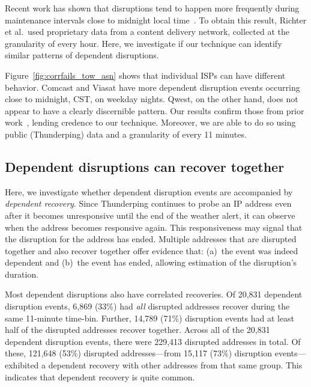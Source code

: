 Recent work has shown that disruptions tend to happen more frequently
during maintenance intervals close to midnight local
time~\cite{advancing-outage-art}. To obtain this result, Richter et
al.~used proprietary data from a content delivery network, collected at
the granularity of every hour.  Here, we investigate if our technique
can identify similar patterns of dependent disruptions.

Figure~\ref{fig:corrfails_tow_asn} shows that individual ISPs can have
different behavior. Comcast and Viasat have more dependent disruption
events occurring close to midnight, CST, on weekday nights. Qwest, on
the other hand, does not appear to have a clearly discernible pattern.
%
Our results confirm those from prior work~\cite{advancing-outage-art},
lending credence to our technique.
%
Moreover, we are able to do so using public (Thunderping) data and a
granularity of every 11 minutes.


\subsection{Dependent disruptions can recover together}

\label{sec:rec}

Here, we investigate whether dependent disruption events are
accompanied by \emph{dependent recovery}. Since Thunderping continues
to probe an IP address even after it becomes unresponsive until the end
of the weather alert, it can observe when the address becomes
responsive again. This responsiveness may signal that the disruption
for the address has ended. Multiple addresses that are disrupted
together and also recover together offer evidence that: (a)~the event
was indeed dependent and (b)~the event has ended, allowing estimation
of the disruption's duration.

Most dependent disruptions also have correlated recoveries.
%
Of 20,831 dependent disruption events, 6,869 (33\%) had \emph{all}
disrupted addresses 
recover during the same 11-minute time-bin.
%
Further, 14,789 (71\%) disruption events had at least half of the
disrupted addresses recover together.
%
Across all of the 20,831 dependent disruption events, there were
229,413 disrupted addresses in total.
%
Of these, 121,648 (53\%) disrupted addresses---from 15,117 (73\%) 
disruption events---exhibited a dependent recovery with other addresses
from that same group.
%
This indicates that dependent recovery is quite common.
%

